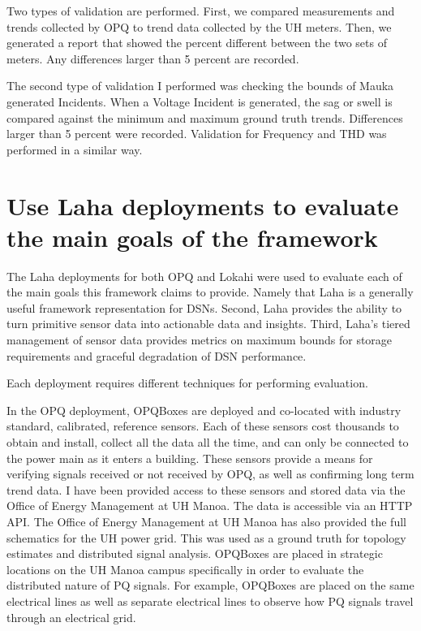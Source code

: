 Two types of validation are performed. First, we compared measurements and trends collected by OPQ to trend data collected by the UH meters. Then, we generated a report that showed the percent different between the two sets of meters. Any differences larger than 5 percent are recorded. 

The second type of validation I performed was checking the bounds of Mauka generated Incidents. When a Voltage Incident is generated, the sag or swell is compared against the minimum and maximum ground truth trends. Differences larger than 5 percent were recorded. Validation for Frequency and THD was performed in a similar way.

\section{Use Laha deployments to evaluate the main goals of the framework}
The Laha deployments for both OPQ and Lokahi were used to evaluate each of the main goals this framework claims to provide. Namely that Laha is a generally useful framework representation for DSNs. Second, Laha provides the ability to turn primitive sensor data into actionable data and insights. Third, Laha's tiered management of sensor data provides metrics on maximum bounds for storage requirements and graceful degradation of DSN performance. 

Each deployment requires different techniques for performing evaluation. 

In the OPQ deployment, OPQBoxes are deployed and co-located with industry standard, calibrated, reference sensors. Each of these sensors cost thousands to obtain and install, collect all the data all the time, and can only be connected to the power main as it enters a building. These sensors provide a means for verifying signals received or not received by OPQ, as well as confirming long term trend data. I have been provided access to these sensors and stored data via the Office of Energy Management at UH Manoa. The data is accessible via an HTTP API. The Office of Energy Management at UH Manoa has also provided the full schematics for the UH power grid. This was used as a ground truth for topology estimates and distributed signal analysis. OPQBoxes are placed in strategic locations on the UH Manoa campus specifically in order to evaluate the distributed nature of PQ signals. For example, OPQBoxes are placed on the same electrical lines as well as separate electrical lines to observe how PQ signals travel through an electrical grid.

